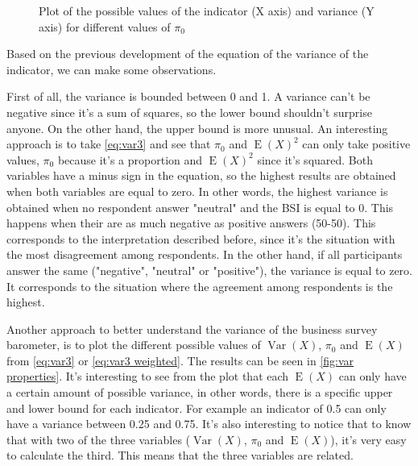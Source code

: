 \documentclass[12pt,a4paper,oneside]{book}
\DeclareMathOperator{\Var}{Var}
\DeclareMathOperator{\E}{E}
\begin{document}
\begin{figure}[hbt!]
    \caption{Plot of the possible values of the indicator (X axis) and variance (Y axis) for different values of $\pi_0$ }
    \label{fig:var properties}
\end{figure}


Based on the previous development of the equation of the variance of the indicator, we can make some observations.

First of all, the variance is bounded between 0 and 1. 
A variance can't be negative since it's a sum of squares, so the lower bound shouldn't surprise anyone. On the other hand, the upper bound is more unusual. 
An interesting approach is to take  \autoref{eq:var3} and see that $\pi_0$ and $\E(X)^2$ can only take positive values, $\pi_0$ because it's a proportion and $\E(X)^2$ since it's squared. 
Both variables have a minus sign in the equation, so the highest results are obtained when both variables are equal to zero.
In other words, the highest variance is obtained when no respondent answer "neutral" and the BSI is equal to 0. 
This happens when their are as much negative as positive answers (50-50).
This corresponds to the interpretation described before, since it's the situation with the most disagreement among respondents.
In the other hand, if all participants answer the same ("negative", "neutral" or "positive"), the variance is equal to zero.
It corresponds to the situation where the agreement among respondents is the highest.

Another approach to better understand the variance of the business survey barometer, is to plot the different possible values of $\Var(X)$, $\pi_0$ and $\E(X)$ from \autoref{eq:var3} or \autoref{eq:var3 weighted}. The results can be seen in \autoref{fig:var properties}.
It's interesting to see from the plot that each $\E(X)$ can only have a certain amount of possible variance, in other words, there is a specific upper and lower bound for each indicator. For example an indicator of 0.5 can only have a variance between 0.25 and 0.75.
It's also interesting to notice that to know that with two of the three variables ($\Var(X)$, $\pi_0$ and $\E(X)$), it's very easy to calculate the third. This means that the three variables are related.
\end{document}
